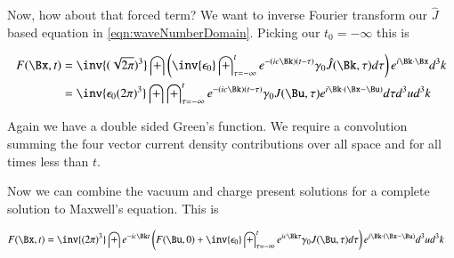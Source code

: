 \documentclass{article}
\begin{document}
Now, how about that forced term?  We want to inverse Fourier transform our $\hat{J}$ based equation in \ref{eqn:waveNumberDomain}.  Picking our $t_0 = -\infty$ this is

\begin{align*}
F(\Bx,t) 
&=
\inv{(\sqrt{2\pi})^3} \int 
\left( \inv{\epsilon_0} \int_{\tau = -\infty}^{t} e^{-(i c \Bk) (t -\tau)} \gamma_0 \hat{J}(\Bk,\tau) d\tau  \right) e^{i \Bk \cdot \Bx} d^3 k \\
&=
\inv{\epsilon_0 ({2\pi})^3} \int 
\int_{\tau = -\infty}^{t} e^{-(i c \Bk) (t -\tau)} \gamma_0 {J}(\Bu,\tau) 
e^{i \Bk \cdot (\Bx-\Bu)} 
d\tau  
d^3 u
d^3 k
\end{align*}

Again we have a double sided Green's function.  We require a convolution summing the four vector current density contributions over all space and for all times less than $t$.

Now we can combine the vacuum and charge present solutions for a complete solution to Maxwell's equation.  This is

\begin{align}
F(\Bx,t) 
&=
\inv{({2\pi})^3} \int 
e^{-i c \Bk t}
\left(
F(\Bu, 0) + \inv{\epsilon_0} \int_{\tau = -\infty}^{t} e^{i c \Bk \tau } \gamma_0 J(\Bu,\tau)  d\tau  
\right)
e^{i \Bk \cdot (\Bx-\Bu)} 
d^3 u
d^3 k
\end{align}



\end{document}

